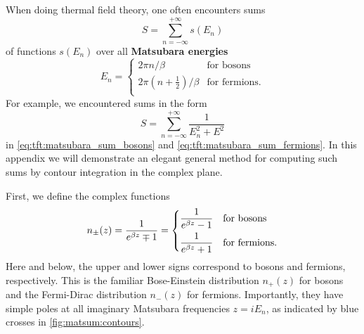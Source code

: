 When doing thermal field theory, one often encounters sums
\begin{equation}
	S = \sum_{n=-\infty}^{+\infty} s(E_n)
\label{eq:matsum:sum}
\end{equation}
of functions $s(E_n)$ over all \textbf{Matsubara energies}
\begin{equation}
	E_n = \begin{cases}
	          2 \pi n / \beta                        & \text{for bosons}    \\
	          2 \pi \left( n+\frac12 \right) / \beta & \text{for fermions} .\\
	      \end{cases}
\end{equation}
For example, we encountered sums in the form
\begin{equation}
	S = \sum_{n=-\infty}^{+\infty} \frac{1}{E_n^2 + E^2}
\label{eq:matsum:motivating_example}
\end{equation}
in \cref{eq:tft:matsubara_sum_bosons} and \cref{eq:tft:matsubara_sum_fermions}.
In this appendix we will demonstrate an elegant general method for computing such sums by contour integration in the complex plane.

First, we define the complex functions
\begin{equation}
	n_\pm(z) = \frac{1}{e^{\beta z} \mp 1}
	         = \begin{dcases}
		           \displaystyle \frac{1}{e^{\beta z} - 1} & \text{for bosons}     \\
		           \displaystyle \frac{1}{e^{\beta z} + 1} & \text{for fermions} . \\
	           \end{dcases}
\label{eq:matsum:distribution}
\end{equation}
Here and below, the upper and lower signs correspond to bosons and fermions, respectively.
This is the familiar Bose-Einstein distribution $n_+(z)$ for bosons and the Fermi-Dirac distribution $n_-(z)$ for fermions.
Importantly, they have simple poles at all imaginary Matsubara frequencies $z = i E_n$, as indicated by blue crosses in \cref{fig:matsum:contours}.

\usetikzlibrary{decorations.markings}
\usetikzlibrary{shapes.misc}

